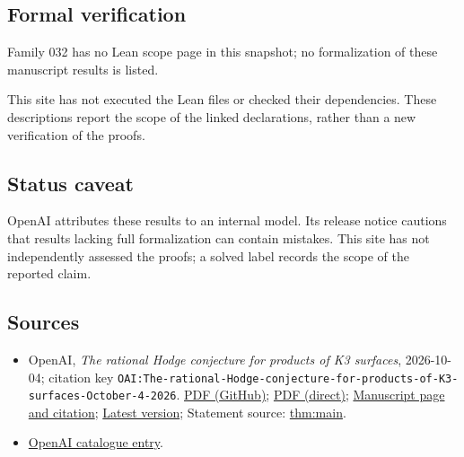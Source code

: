 \documentclass[11pt]{article}
\begin{document}
\subsection{Formal verification}
Family 032 has no Lean scope page in this snapshot; no formalization of these manuscript results is listed.

This site has not executed the Lean files or checked their dependencies. These descriptions report the scope of the linked declarations, rather than a new verification of the proofs.

\subsection{Status caveat}
OpenAI attributes these results to an internal model. Its release notice cautions that results lacking full formalization can contain mistakes. This site has not independently assessed the proofs; a solved label records the scope of the reported claim.

\subsection{Sources}
\begin{itemize}
\item OpenAI, \emph{The rational Hodge conjecture for products of K3 surfaces}, 2026-10-04; citation key \texttt{OAI:The-rational-Hodge-conjecture-for-products-of-K3-surfaces-October-4-2026}. \href{https://github.com/openai/math/blob/adc7f1241b42e322a6451854ab7e4b4c146bf78a/preprints/The-rational-Hodge-conjecture-for-products-of-K3-surfaces-October-4-2026/hodge-conjecture-products-k3.pdf}{PDF (GitHub)}; \href{https://github.com/openai/math/raw/adc7f1241b42e322a6451854ab7e4b4c146bf78a/preprints/The-rational-Hodge-conjecture-for-products-of-K3-surfaces-October-4-2026/hodge-conjecture-products-k3.pdf}{PDF (direct)}; \href{https://github.com/openai/math/blob/adc7f1241b42e322a6451854ab7e4b4c146bf78a/preprints/The-rational-Hodge-conjecture-for-products-of-K3-surfaces-October-4-2026/README.md}{Manuscript page and citation}; \href{https://github.com/openai/math/blob/main/preprints/The-rational-Hodge-conjecture-for-products-of-K3-surfaces-October-4-2026/hodge-conjecture-products-k3.pdf}{Latest version}; Statement source: \href{https://github.com/openai/math/blob/adc7f1241b42e322a6451854ab7e4b4c146bf78a/preprints/The-rational-Hodge-conjecture-for-products-of-K3-surfaces-October-4-2026/build/manuscript/introduction.tex\#L14}{thm:main}.
\item \href{https://github.com/openai/math/blob/adc7f1241b42e322a6451854ab7e4b4c146bf78a/CONTENTS.md}{OpenAI catalogue entry}.
\end{itemize}
\end{document}
